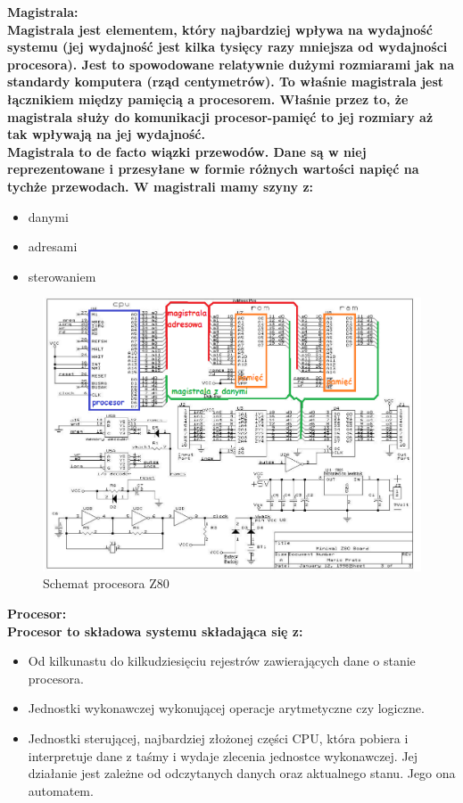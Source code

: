\documentclass[a4paper,12pt]{article}
\newcommand{\h}[1]{\noindent \bf #1 \rm \\ \noindent}
\begin{document}
\h{Magistrala:}
Magistrala jest elementem, który najbardziej wpływa na wydajność systemu (jej wydajność jest kilka tysięcy razy mniejsza od wydajności procesora). Jest to spowodowane relatywnie dużymi rozmiarami jak na standardy komputera (rząd centymetrów). To właśnie magistrala jest łącznikiem między pamięcią a procesorem. Właśnie przez to, że magistrala służy do komunikacji procesor-pamięć to jej rozmiary aż tak wpływają na jej wydajność.\\

\noindent
Magistrala to de facto wiązki przewodów. Dane są w niej reprezentowane i przesyłane w formie różnych wartości napięć na tychże przewodach. W magistrali mamy szyny z:
\begin{itemize}
	\item danymi
	\item adresami
	\item sterowaniem
\end{itemize}

\begin{figure}[H]
	\centering
	\includegraphics[width=12cm]{fig2.png}
	\caption{Schemat procesora Z80}
	\label{fig.magistrale}
\end{figure}

\h{Procesor:}
Procesor to składowa systemu składająca się z:
\begin{itemize}
	\item Od kilkunastu do kilkudziesięciu rejestrów zawierających dane o stanie procesora. 
	\item Jednostki wykonawczej wykonującej operacje arytmetyczne czy logiczne.
	\item Jednostki sterującej, najbardziej złożonej części CPU, która pobiera i interpretuje dane z taśmy i wydaje zlecenia jednostce wykonawczej. Jej działanie jest zależne od odczytanych danych oraz aktualnego stanu. Jego ona automatem.
\end{itemize}
\end{document}
